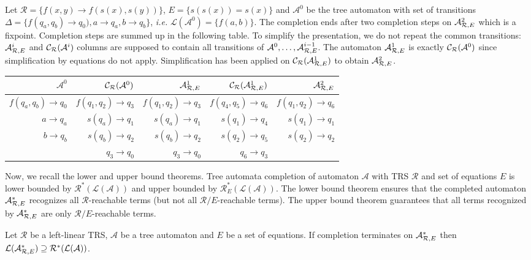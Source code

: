\documentclass[a4paper,11pt]{llncs}
\newcommand{\A}{\mathcal{A}}
\def \R {\mathcal{R}}
\newcommand{\Lang}{\mathcal{L}}
\newcommand{\desc}{\R^*}
\newcommand{\rw}{\rightarrow}
\newcommand{\nr}{E}
\newcommand{\comp}{{\cal C}}
\newcommand{\aapprox}{{\cal A}_{\R, \nr}}
\theoremstyle{plain}
\begin{document}
\begin{example}
  Let $\R=\{f(x, y) \rw f(s(x), s(y))\}$, $E=\{ s(s(x))=s(x) \}$ and $\A^0$ be
  the tree automaton with set of transitions $\Delta=\{f(q_a, q_b) \rw q_0), a
  \rw q_a, b \rw q_b\}$, {\em i.e.} $\Lang(\A^0)=\{f(a,b)\}$. The completion ends
  after two completion steps on $\aapprox^2$ which is a fixpoint. Completion
  steps are summed up in the following table. To simplify the presentation, we do
  not repeat the common transitions: $\aapprox^i$ and $\comp_\R(\A^{i})$ columns
  are supposed to contain all transitions of $\A^0,\ldots, \aapprox^{i-1}$.
The automaton $\aapprox^1$ is exactly $\comp_{\R}(\A^0)$ since
simplification by equations do not apply. Simplification has been applied on
$\comp_\R(\aapprox^1)$ to obtain $\aapprox^2$.

\noindent
{\small
\begin{center}
\begin{tabular}{||r||r|r||r|r||}
\hline 
$\A^0$ & $\comp_\R(\A^0)$ & $\aapprox^1$ & $\comp_\R(\aapprox^1)$ & $\aapprox^2$\\
\hline
$f(q_a, q_b) \rw q_0$ & $f(q_1, q_2) \rw q_3$ & $f(q_1, q_2) \rw q_3$ & $f(q_4,q_5) \rw q_6$ & $f(q_1, q_2) \rw q_6$\\
$a \rw q_a$ & $s(q_a) \rw q_1$ & $s(q_a) \rw q_1$ & $s(q_1)\rw q_4$ & $s(q_1) \rw q_1$ \\ 
$b \rw q_b$ & $s(q_b) \rw q_2$ & $s(q_b) \rw q_2$ & $s(q_2) \rw q_5$ & $s(q_2) \rw q_2$ \\
            & $q_3 \rw q_0 $ & $q_3 \rw q_0 $ & $q_6 \rw q_3 $ & \\
\hline
\end{tabular}
\end{center}}
\end{example}

\noindent
Now, we recall the lower and upper bound theorems.  Tree automata completion of
automaton $\A$ with TRS $\R$ and set of equations $E$ is lower bounded by
$\R^*(\Lang(\A))$ and upper bounded by $\R^*_{E}(\Lang(\A))$. The lower bound theorem 
ensures that the completed automaton $\aapprox^*$ recognizes all $\R$-reachable
terms (but not all $\R/E$-reachable terms). The upper bound theorem guarantees
that all terms recognized by $\aapprox^*$ are only $\R/E$-reachable terms. 

\begin{theorem}
  \label{completeness}
  Let $\R$ be a left-linear TRS, $\A$ be a tree automaton and $\nr$ be a set of
  equations. If completion terminates on $\aapprox^*$ then
$\Lang(\aapprox^*)\supseteq \desc(\Lang(\A))$.
\end{theorem}
\end{document}
